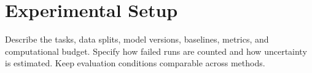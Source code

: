 \section{Experimental Setup}
\label{sec:experimental_setup}
Describe the tasks, data splits, model versions, baselines, metrics, and
computational budget. Specify how failed runs are counted and how uncertainty
is estimated. Keep evaluation conditions comparable across methods.
